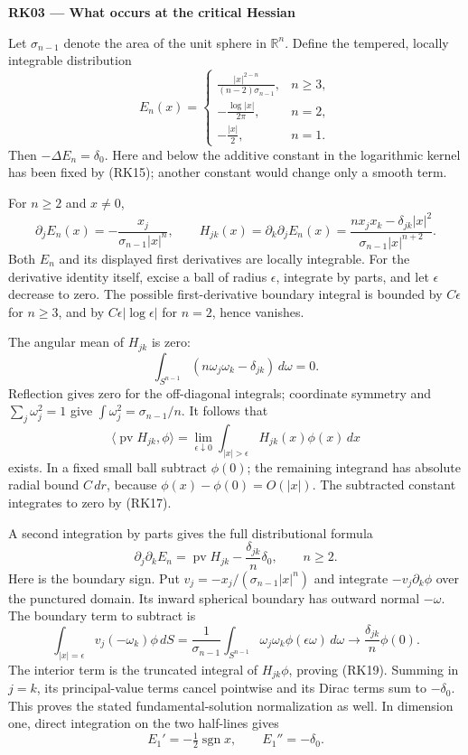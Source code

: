 \documentclass[
  11pt,
]{article}
\begin{document}
\textbf{RK03 --- What occurs at the critical Hessian}

Let \(\sigma_{n-1}\) denote the area of the unit sphere in
\(\mathbb R^n\). Define the tempered, locally integrable distribution \[
 E_n(x)=
 \begin{cases}
 \displaystyle\frac{|x|^{2-n}}{(n-2)\sigma_{n-1}},& n\geq3,\\[4pt]
 \displaystyle-\frac{\log|x|}{2\pi},& n=2,\\[4pt]
 \displaystyle-\frac{|x|}{2},& n=1.
 \end{cases}
 \tag{RK15}
\] Then \(-\Delta E_n=\delta_0\). Here and below the additive constant
in the logarithmic kernel has been fixed by (RK15); another constant
would change only a smooth term.

For \(n\geq2\) and \(x\ne0\), \[
 \partial_jE_n(x)=-\frac{x_j}{\sigma_{n-1}|x|^n},\qquad
 H_{jk}(x)=\partial_k\partial_jE_n(x)
 =\frac{n x_jx_k-\delta_{jk}|x|^2}
        {\sigma_{n-1}|x|^{n+2}}.
 \tag{RK16}
\] Both \(E_n\) and its displayed first derivatives are locally
integrable. For the derivative identity itself, excise a ball of radius
\(\epsilon\), integrate by parts, and let \(\epsilon\) decrease to zero.
The possible first-derivative boundary integral is bounded by
\(C\epsilon\) for \(n\geq3\), and by \(C\epsilon|\log\epsilon|\) for
\(n=2\), hence vanishes.

The angular mean of \(H_{jk}\) is zero: \[
 \int_{S^{n-1}}(n\omega_j\omega_k-\delta_{jk})\,d\omega=0.
 \tag{RK17}
\] Reflection gives zero for the off-diagonal integrals; coordinate
symmetry and \(\sum_j\omega_j^2=1\) give
\(\int\omega_j^2=\sigma_{n-1}/n\). It follows that \[
 \langle\operatorname{pv}H_{jk},\phi\rangle
 =\lim_{\epsilon\downarrow0}
   \int_{|x|>\epsilon}H_{jk}(x)\phi(x)\,dx
 \tag{RK18}
\] exists. In a fixed small ball subtract \(\phi(0)\); the remaining
integrand has absolute radial bound \(C\,dr\), because
\(\phi(x)-\phi(0)=O(|x|)\). The subtracted constant integrates to zero
by (RK17).

A second integration by parts gives the full distributional formula \[
 \partial_j\partial_kE_n
 =\operatorname{pv}H_{jk}-\frac{\delta_{jk}}{n}\delta_0,
 \qquad n\geq2.
 \tag{RK19}
\] Here is the boundary sign. Put \(v_j=-x_j/(\sigma_{n-1}|x|^n)\) and
integrate \(-v_j\partial_k\phi\) over the punctured domain. Its inward
spherical boundary has outward normal \(-\omega\). The boundary term to
subtract is \[
 \int_{|x|=\epsilon}v_j(-\omega_k)\phi\,dS
 =\frac{1}{\sigma_{n-1}}
   \int_{S^{n-1}}\omega_j\omega_k\phi(\epsilon\omega)\,d\omega
 \longrightarrow \frac{\delta_{jk}}n\phi(0).
\] The interior term is the truncated integral of \(H_{jk}\phi\),
proving (RK19). Summing in \(j=k\), its principal-value terms cancel
pointwise and its Dirac terms sum to \(-\delta_0\). This proves the
stated fundamental-solution normalization as well. In dimension one,
direct integration on the two half-lines gives \[
 E_1'=-\tfrac12\operatorname{sgn}x,\qquad E_1''=-\delta_0.
 \tag{RK20}
\]
\end{document}
